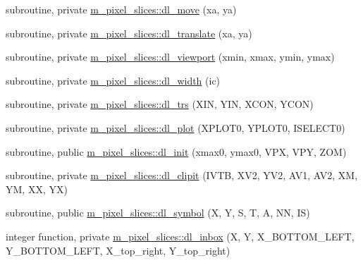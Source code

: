 \begin{DoxyCompactItemize}
\item 
subroutine, private \mbox{\hyperlink{namespacem__pixel__slices_ab9e9530d7fb4fbea1bc5d52744498731}{m\+\_\+pixel\+\_\+slices\+::dl\+\_\+move}} (xa, ya)
\item 
subroutine, private \mbox{\hyperlink{namespacem__pixel__slices_ad35fa14bd29e8e895f22de6500b6b5ff}{m\+\_\+pixel\+\_\+slices\+::dl\+\_\+translate}} (xa, ya)
\item 
subroutine, private \mbox{\hyperlink{namespacem__pixel__slices_a87a664883c6c5e0e2812df4d1ea29515}{m\+\_\+pixel\+\_\+slices\+::dl\+\_\+viewport}} (xmin, xmax, ymin, ymax)
\item 
subroutine, private \mbox{\hyperlink{namespacem__pixel__slices_a2a4bb6da0ae36c65fdf05996e3ae5487}{m\+\_\+pixel\+\_\+slices\+::dl\+\_\+width}} (ic)
\item 
subroutine, private \mbox{\hyperlink{namespacem__pixel__slices_a141b4da9ce5a0d633cc488f656c0320d}{m\+\_\+pixel\+\_\+slices\+::dl\+\_\+trs}} (X\+IN, Y\+IN, X\+C\+ON, Y\+C\+ON)
\item 
subroutine, private \mbox{\hyperlink{namespacem__pixel__slices_aa70737b5f5945b2f513163ee5c40942d}{m\+\_\+pixel\+\_\+slices\+::dl\+\_\+plot}} (X\+P\+L\+O\+T0, Y\+P\+L\+O\+T0, I\+S\+E\+L\+E\+C\+T0)
\item 
subroutine, public \mbox{\hyperlink{namespacem__pixel__slices_a4ac8bc6e1f869e60a675611420fee0f7}{m\+\_\+pixel\+\_\+slices\+::dl\+\_\+init}} (xmax0, ymax0, V\+PX, V\+PY, Z\+OM)
\item 
subroutine, private \mbox{\hyperlink{namespacem__pixel__slices_af0a3aeaa17e192568cb6a69a3b3eeab6}{m\+\_\+pixel\+\_\+slices\+::dl\+\_\+clipit}} (I\+V\+TB, X\+V2, Y\+V2, A\+V1, A\+V2, XM, YM, XX, YX)
\item 
subroutine, public \mbox{\hyperlink{namespacem__pixel__slices_a2a40fc08575b18772b520c7b5b81a91e}{m\+\_\+pixel\+\_\+slices\+::dl\+\_\+symbol}} (X, Y, S, T, A, NN, IS)
\item 
integer function, private \mbox{\hyperlink{namespacem__pixel__slices_aa0de53a25754eab8fff1732aa2f93eba}{m\+\_\+pixel\+\_\+slices\+::dl\+\_\+inbox}} (X, Y, X\+\_\+\+B\+O\+T\+T\+O\+M\+\_\+\+L\+E\+FT, Y\+\_\+\+B\+O\+T\+T\+O\+M\+\_\+\+L\+E\+FT, X\+\_\+top\+\_\+right, Y\+\_\+top\+\_\+right)
\end{DoxyCompactItemize}

